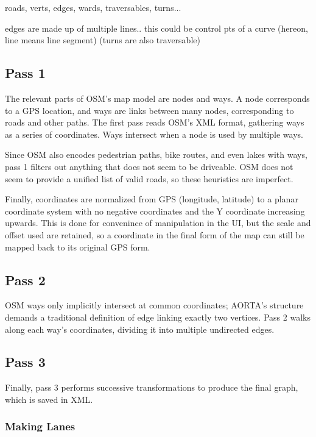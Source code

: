 \documentclass[12pt]{article}
\begin{document}
roads, verts, edges, wards, traversables, turns...

edges are made up of multiple lines.. this could be control pts of a curve
(hereon, line means line segment)
(turns are also traversable)

\subsection{Pass 1}

The relevant parts of OSM's map model are nodes and ways. A node corresponds to
a GPS location, and ways are links between many nodes, corresponding to roads
and other paths. The first pass reads OSM's XML format, gathering ways as a
series of coordinates. Ways intersect when a node is used by multiple ways.

Since OSM also encodes pedestrian paths, bike routes, and even lakes with ways,
pass 1 filters out anything that does not seem to be driveable. OSM does not
seem to provide a unified list of valid roads, so these heuristics are
imperfect.

Finally, coordinates are normalized from GPS (longitude, latitude) to a planar
coordinate system with no negative coordinates and the Y coordinate increasing
upwards. This is done for convenince of manipulation in the UI, but the scale
and offset used are retained, so a coordinate in the final form of the map can
still be mapped back to its original GPS form.

\subsection{Pass 2}

OSM ways only implicitly intersect at common coordinates; AORTA's structure
demands a traditional definition of edge linking exactly two vertices. Pass 2
walks along each way's coordinates, dividing it into multiple undirected edges.

\subsection{Pass 3}

Finally, pass 3 performs successive transformations to produce the final graph,
which is saved in XML.

\subsubsection{Making Lanes}
\end{document}
